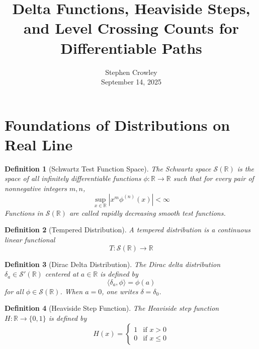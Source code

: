 \documentclass{article}
\newcommand{\tmaffiliation}[1]{\\ #1}
\newtheorem{definition}{Definition}
\begin{document}
\title{Delta Functions, Heaviside Steps, and Level Crossing Counts for
Differentiable Paths}

\author{
  Stephen Crowley
  \tmaffiliation{September 14, 2025}
}

\date{}

\maketitle

{\tableofcontents}

\section{Foundations of Distributions on Real Line}

\begin{definition}
  [Schwartz Test Function Space] The Schwartz space $\mathcal{S} (\mathbb{R})$
  is the space of all infinitely differentiable functions $\phi : \mathbb{R}
  \to \mathbb{R}$ such that for every pair of nonnegative integers $m, n$,
  \begin{equation}
    \sup_{x \in \mathbb{R}} |x^m \phi^{(n)} (x) | < \infty
  \end{equation}
  Functions in $\mathcal{S} (\mathbb{R})$ are called rapidly decreasing smooth
  test functions.
\end{definition}

\begin{definition}
  [Tempered Distribution] A tempered distribution is a continuous linear
  functional
  \begin{equation}
    T : \mathcal{S} (\mathbb{R}) \to \mathbb{R}
  \end{equation}
\end{definition}

\begin{definition}
  [Dirac Delta Distribution] The Dirac delta distribution $\delta_a \in
  \mathcal{S}' (\mathbb{R})$ centered at $a \in \mathbb{R}$ is defined by
  \begin{equation}
    \langle \delta_a, \phi \rangle = \phi (a)
  \end{equation}
  for all $\phi \in \mathcal{S} (\mathbb{R})$. When $a = 0$, one writes
  $\delta = \delta_0$.
\end{definition}

\begin{definition}
  [Heaviside Step Function] The Heaviside step function $H : \mathbb{R} \to
  \{0, 1\}$ is defined by
  \begin{equation}
    H (x) = \left\{\begin{array}{ll}
      1 & \text{if } x > 0\\
      0 & \text{if } x \leq 0
    \end{array}\right.
  \end{equation}
\end{definition}
\end{document}
